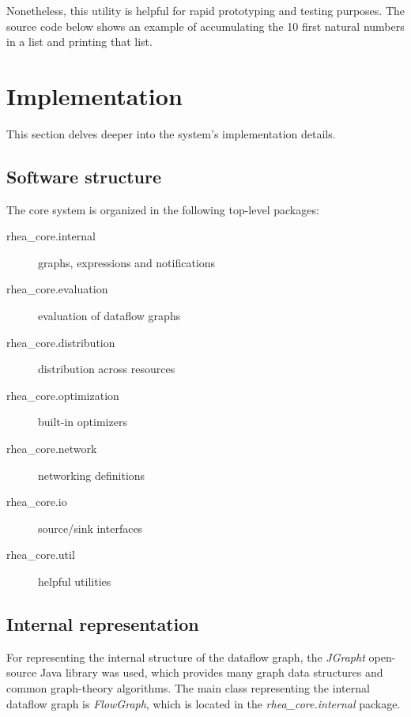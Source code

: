 \documentclass[sigplan,review,anonymous]{acmart}
\begin{document}
Nonetheless, this utility is helpful for rapid prototyping and testing purposes.
The source code below shows an example of accumulating the 10 first natural
numbers in a list and printing that list.


\section{Implementation} \label{sec:implementation} This section delves deeper
into the system's implementation details.

\subsection{Software structure}

The core system is organized in the following top-level packages:

\begin{description}
\item[rhea\_core.internal] graphs, expressions and notifications

\item[rhea\_core.evaluation] evaluation of dataflow graphs

\item[rhea\_core.distribution] distribution across resources

\item[rhea\_core.optimization] built-in optimizers

\item[rhea\_core.network] networking definitions

\item[rhea\_core.io] source/sink interfaces

\item[rhea\_core.util] helpful utilities
\end{description}

\subsection{Internal representation}

For representing the internal structure of the dataflow graph, the
\textit{JGrapht} open-source Java library was used, which provides many graph
data structures and common graph-theory algorithms.
The main class representing the internal dataflow graph is \textit{FlowGraph},
which is located in the \textit{rhea\_core.internal} package.
\end{document}
